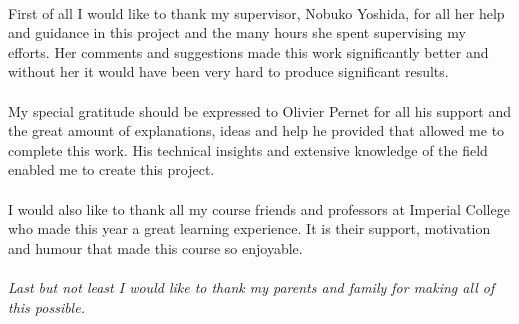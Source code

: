 
\begin{acknowledgements}

\paragraph*{}
First of all I would like to thank my supervisor, Nobuko Yoshida, for all her help and guidance in this project and the many hours she spent supervising my efforts. Her comments and suggestions made this work significantly better and without her it would have been very hard to produce significant results. 

\paragraph*{}
My special gratitude should be expressed to Olivier Pernet for all his support and the great amount of explanations, ideas and help he provided that allowed me to complete this work. His technical insights and extensive knowledge of the field enabled me to create this project.
 
\paragraph*{}
I would also like to thank all my course friends and professors at Imperial College who made this year a great learning experience. It is their support, motivation and humour that made this course so enjoyable.

\vskip 1in
\paragraph*{}
\textit{Last but not least I would like to thank my parents and family for making all of this possible.}
   




\end{acknowledgements}